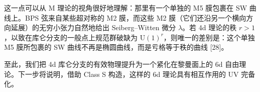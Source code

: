 这一点可以从 M 理论的视角很好地理解：那里有一个单独的 M5 膜包裹在 SW 曲线上。BPS 弦来自某些超对称的 M2 膜，而这些 M2 膜（它们还沿另一个横向方向延展）的无穷小张力自然地给出 Seiberg--Witten 微分 $\lambda$。若 4d 理论的秩 $r>1$，以致在库仑分支的一般点上规范群破缺为 $\mathrm{U}(1)^r$，则唯一的差别是：这个单独 M5 膜所包裹的 SW 曲线不再是椭圆曲线，而是亏格等于秩的曲线 [28]。

至此，我们把 4d 库仑分支的有效物理提升为一个紧化在黎曼面上的 6d 自由理论。下一步将说明，借助 Class S 构造，这样的 6d 理论具有相互作用的 UV 完备化。

